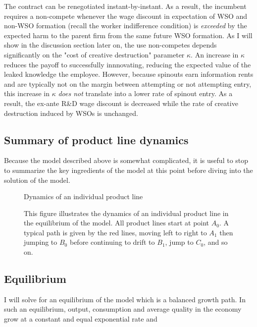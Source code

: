 \documentclass[12pt,english]{article}
\theoremstyle{remark}
\begin{document}
The contract can be renegotiated instant-by-instant. As a result, the incumbent requires a non-compete whenever the wage discount in expectation of WSO and non-WSO formation (recall the worker indifference condition) is \textit{exceeded} by the expected harm to the parent firm from the same future WSO formation. As I will show in the discussion section later on, the use non-competes depends significantly on the "cost of creative destruction" parameter $\kappa$. An increase in $\kappa$ reduces the payoff to successfully innnovating, reducing the expected value of the leaked knowledge the employee. However, because spinouts earn information rents and are typically not on the margin between attempting or not attempting entry, this increase in $\kappa$ \textit{does not} translate into a lower rate of spinout entry. As a result, the ex-ante R\&D wage discount is decreased while the rate of creative destruction induced by WSOs is unchanged. 



\subsection{Summary of product line dynamics}

Because the model described above is somewhat complicated, it is useful to stop to summarize the key ingredients of the model at this point before diving into the solution of the model. 

\begin{figure}[h]{Dynamics of an individual product line}
	\centering
	
	\caption{This figure illustrates the dynamics of an individual product line in the equilibrium of the model. All product lines start at point $A_0$. A typical path is given by the red lines, moving left to right to $A_1$ then jumping to $B_0$ before continuing to drift to $B_1$, jump to $C_0$, and so on.}
	\label{individual_product_line_dynamics}
\end{figure}





\subsection{Equilibrium}

I will solve for an equilibrium of the model which is a balanced growth path. In such an equilibrium, output, consumption and average quality in the economy grow at a constant and equal exponential rate and 
\end{document}
